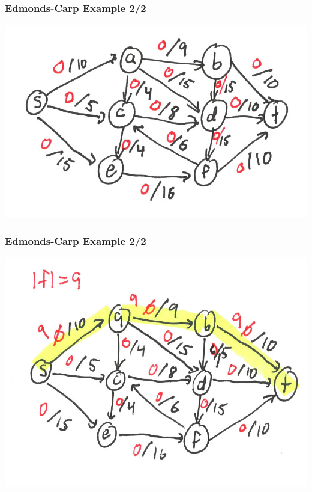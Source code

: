 \documentclass{beamer}
\begin{document}
\begin{frame} \frametitle{Edmonds-Carp Example 2/2}
\begin{center}
  \includegraphics[scale=1]{ek-2-1.png}
\end{center}
\end{frame}

\begin{frame} \frametitle{Edmonds-Carp Example 2/2}
\begin{center}
  \includegraphics[scale=1]{ek-2-2.png}
\end{center}
\end{frame}
\end{document}
